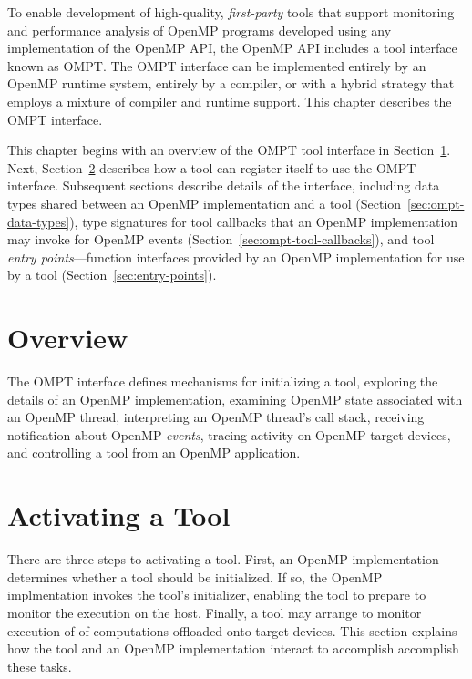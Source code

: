 To enable development of high-quality, \emph{first-party} tools
that support monitoring and performance analysis of OpenMP programs
developed using any implementation of the OpenMP API, the OpenMP API
includes a tool interface known as OMPT. The OMPT interface can be
implemented entirely by an OpenMP runtime system, entirely by a
compiler, or with a hybrid strategy that employs a mixture of compiler
and runtime support. This chapter describes the OMPT interface.

This chapter begins with an overview of the OMPT tool interface in
Section~\ref{sec:ompt-overview}. Next,
Section~\ref{sec:ompt-initialization} describes how a tool can register itself to use the OMPT
interface. Subsequent sections describe details of the interface, including
data types shared between an OpenMP implementation and a tool
(Section~\ref{sec:ompt-data-types}), 
type signatures for tool callbacks 
that an OpenMP implementation may invoke for OpenMP events
(Section~\ref{sec:ompt-tool-callbacks}), and 
tool \emph{entry points}---function interfaces
provided by an OpenMP implementation for use by a tool
(Section~\ref{sec:entry-points}). 

\section{Overview}
\label{sec:ompt-overview}

The OMPT interface defines mechanisms for initializing a tool,
exploring the details of an OpenMP implementation, examining OpenMP state
associated with an OpenMP thread, interpreting an OpenMP thread's call stack,
receiving notification about OpenMP \emph{events}, tracing activity on 
OpenMP target devices, and controlling a tool from an OpenMP application.

\section{Activating a Tool}
\label{sec:ompt-initialization}

There are three steps to activating a tool. First, an OpenMP
implementation determines whether a tool should be initialized.  If
so, the OpenMP implmentation invokes the tool's initializer, enabling
the tool to prepare to monitor the execution on the host. Finally, a
tool may arrange to monitor execution of of computations offloaded
onto target devices. This section explains how the tool and an 
OpenMP implementation interact to accomplish accomplish these tasks.


